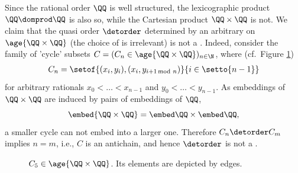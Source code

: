 \begin{slexample} \label{ex:Cartesian}
Since the rational order  $\QQ$ is well structured,  
the lexicographic product
$\QQ\domprod \QQ$ is also so, while
the Cartesian product $\QQ\times\QQ$ is not.
We claim that the quasi order $\detorder$
determined by an arbitrary \wqo on $\age{\QQ\times\QQ}$ (the choice of \wqo is irrelevant)
is not a \wqo.
Indeed,
consider the family of 'cycle' subsets $C=(C_n\in\age{\QQ\times\QQ})_{n\in\N}$, where
(cf.~Figure \ref{fig:Cn})
\begin{align*}
C_n = \setof{(x_i, y_i), (x_i, y_{i+1\!\!\!\mod n})}{i\in\setto {n-1}}
\end{align*}
for arbitrary rationals $x_0< \ldots < x_{n-1}$ and $y_0 < \ldots < y_{n-1}$.
As embeddings of $\QQ\times\QQ$ are induced by pairs of embeddings of $\QQ$,
\[
\embed{\QQ\times\QQ} = \embed \QQ \times \embed \QQ,
\]
a smaller cycle can not embed into a larger one.
Therefore $C_n \detorder C_m$ implies $n=m$, i.e., $C$ is an antichain,
and hence $\detorder$ is not a \wqo.
%
\begin{figure}
\caption{$C_5\in\age {\QQ\times\QQ}$. \rm Its elements are depicted by edges.}
\label{fig:Cn}
\end{figure}
\end{slexample}
